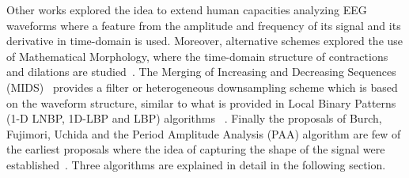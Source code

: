 Other works explored the idea to extend human capacities analyzing EEG waveforms \cite{Klein1976} where a feature from the amplitude and frequency of its signal and its derivative in time-domain is used.  Moreover, alternative schemes explored the use of Mathematical Morphology, where the time-domain structure of contractions and dilations are studied~\cite{Yamaguchi2009}. The Merging of Increasing and Decreasing Sequences (MIDS)~\cite{Zhang2013} provides a filter or heterogeneous downsampling scheme which is based on the waveform structure, similar to what is provided in Local Binary Patterns  (1-D LNBP, 1D-LBP and LBP) algorithms~\cite{Jaiswal2017} .  Finally the proposals of Burch, Fujimori, Uchida and the Period Amplitude Analysis (PAA) algorithm are few of the earliest proposals where the idea of capturing the shape of the signal were established~\cite{Uchida1996}.  Three algorithms are explained in detail in the following section.



%
%
%
%
%
%
%
%
%
%

